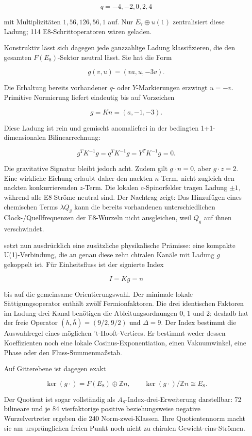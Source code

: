 \[
q=-4,-2,0,2,4
\]

mit Multiplizitäten \(1,56,126,56,1\) auf. Nur \(E_7\oplus u(1)\) zentralisiert diese Ladung; 114 E8-Schrittoperatoren wären geladen.

Konstruktiv lässt sich dagegen jede ganzzahlige Ladung klassifizieren, die den gesamten \(F(E_8)\)-Sektor neutral lässt. Sie hat die Form

\[
g(v,u)=(va,u,-3v).
\]

Die Erhaltung bereits vorhandener \(q\)- oder \(Y\)-Markierungen erzwingt \(u=-v\). Primitive Normierung liefert eindeutig bis auf Vorzeichen

\[
\boxed{g=Kn=(a,-1,-3).}
\]

Diese Ladung ist rein und gemischt anomaliefrei in der bedingten 1+1-dimensionalen Bilinearrechnung:

\[
g^TK^{-1}g=q^TK^{-1}g=Y^TK^{-1}g=0.
\]

Die gravitative Signatur bleibt jedoch acht. Zudem gilt \(g\cdot n=0\), aber \(g\cdot z=2\). Eine wirkliche Eichung erlaubt daher den nackten \(n\)-Term, nicht zugleich den nackten konkurrierenden \(z\)-Term. Die lokalen \(c\)-Spinorfelder tragen Ladung \(\pm1\), während alle E8-Ströme neutral sind. Der Nachtrag  zeigt: Das Hinzufügen eines chemischen Terms \(\lambda Q_g\) kann die bereits vorhandenen unterschiedlichen Clock-/Quellfrequenzen der E8-Wurzeln nicht ausgleichen, weil \(Q_g\) auf ihnen verschwindet.

 setzt nun ausdrücklich eine zusätzliche physikalische Prämisse: eine kompakte U(1)-Verbindung, die an genau diese zehn chiralen Kanäle mit Ladung \(g\) gekoppelt ist. Für Einheitsfluss ist der signierte Index

\[
I=Kg=n
\]

bis auf die gemeinsame Orientierungswahl. Der minimale lokale Sättigungsoperator enthält zwölf Fermionfaktoren. Die drei identischen Faktoren im Ladung-drei-Kanal benötigen die Ableitungsordnungen 0, 1 und 2; deshalb hat der freie Operator \((h,\bar h)=(9/2,9/2)\) und \(\Delta=9\). Der Index bestimmt die Auswahlregel eines möglichen 't-Hooft-Vertices. Er bestimmt weder dessen Koeffizienten noch eine lokale Cosinus-Exponentiation, einen Vakuumwinkel, eine Phase oder den Fluss-Summenmaßstab.

Auf Gitterebene ist dagegen exakt

\[
\ker(g\cdot)=F(E_8)\oplus\mathbb Zn,\qquad
\ker(g\cdot)/\mathbb Zn\cong E_8.
\]

Der Quotient ist sogar vollständig als \(A_8\)-Index-drei-Erweiterung darstellbar: 72 bilineare und je 84 vierfaktorige positive beziehungsweise negative Wurzelvertreter ergeben die 240 Norm-zwei-Klassen. Ihre Quotientennorm macht sie am ursprünglichen freien Punkt noch nicht zu chiralen Gewicht-eins-Strömen.

